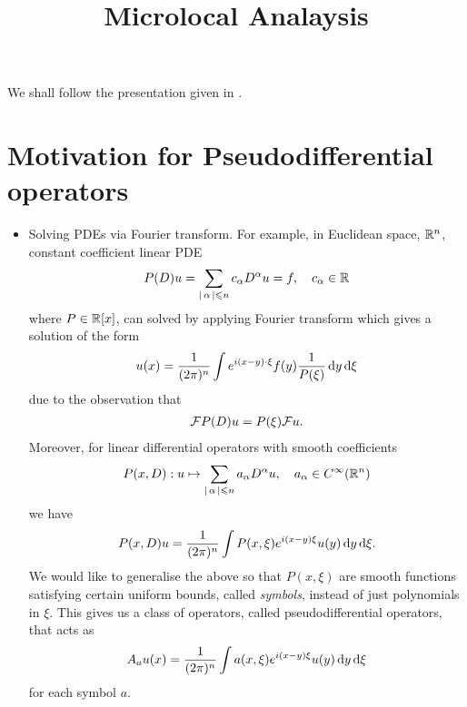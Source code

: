\documentclass[12pt]{article}
\title{Microlocal Analaysis}
\date{}
\begin{document}
%  

We shall follow the presentation given in  \cite{melrose intro to microlocal}. 

\section{Motivation for Pseudodifferential operators} 
\begin{itemize}
    \item Solving PDEs via Fourier transform. For example, in Euclidean space, $\R^n$, constant coefficient linear PDE
    \begin{align*}
    P(D) u = \sum_{\abs{\alpha} \leq n} c_\alpha D^{\alpha} u = f, \quad c_\alpha \in \R
    \end{align*}
    where $P \in \R[x]$, can solved by applying Fourier transform which gives a solution of the form
    \begin{align*}
    u(x) = \frac{1}{(2\pi)^n} \int e^{i(x - y)\cdot \xi} f(y) \frac{1}{P(\xi)} \d[y] \d[\xi]
    \end{align*}
    due to the observation that
    \begin{align*}
    \F P(D) u = P(\xi) \F u. 
    \end{align*}
    Moreover, for linear differential operators with smooth coefficients
    \begin{align*}
    P(x, D):  u \mapsto \sum_{\abs{\alpha} \leq n } a_\alpha D^\alpha u, \quad a_\alpha \in C^\infty(\R^n)
    \end{align*}
    we have
    \begin{align*}
    P(x, D) u = \frac{1}{(2\pi)^n} \int P(x, \xi) e^{i(x -y) \xi} u(y)\d[y] \d[\xi].
    \end{align*}
    We would like to generalise the above so that $P(x, \xi)$ are smooth functions satisfying certain uniform bounds, called \emph{symbols}, instead of just polynomials in $\xi$. This gives us a class of operators, called pseudodifferential operators, that acts as 
    \begin{align*}
    A_a u (x) =  \frac{1}{(2\pi)^n} \int a(x, \xi) e^{i(x -y) \xi} u(y)\d[y] \d[\xi]
    \end{align*}
    for each symbol $a$.
    

\end{itemize}
\end{document}
